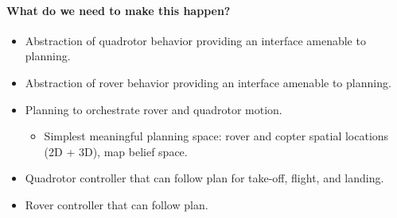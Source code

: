 \documentclass[conference]{IEEEtran}
\begin{document}
\paragraph{What do we need to make this happen?}

\begin{itemize}
  \item Abstraction of quadrotor behavior providing an interface amenable to planning.
  \item Abstraction of rover behavior providing an interface amenable to planning.
  \item Planning to orchestrate rover and quadrotor motion.
  \begin{itemize}
    \item Simplest meaningful planning space: rover and copter spatial locations (2D + 3D), map belief space.
  \end{itemize}
  \item Quadrotor controller that can follow plan for take-off, flight, and landing.
  \item Rover controller that can follow plan.
\end{itemize}

\printbibliography
\end{document}
